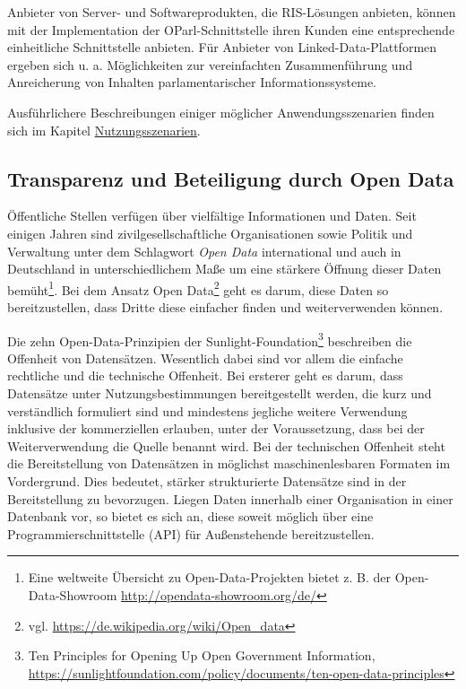 \documentclass[,a4paper]{article}
\begin{document}
Anbieter von Server- und Softwareprodukten, die RIS-Lösungen anbieten,
können mit der Implementation der OParl-Schnittstelle ihren Kunden eine
entsprechende einheitliche Schnittstelle anbieten. Für Anbieter von
Linked-Data-Plattformen ergeben sich u. a. Möglichkeiten zur
vereinfachten Zusammenführung und Anreicherung von Inhalten
parlamentarischer Informationssysteme.

Ausführlichere Beschreibungen einiger möglicher Anwendungsszenarien
finden sich im Kapitel \hyperref[nutzungsszenarien]{Nutzungsszenarien}.

\subsection{Transparenz und Beteiligung durch Open
Data}\label{transparenz-und-beteiligung-durch-open-data}

Öffentliche Stellen verfügen über vielfältige Informationen und Daten.
Seit einigen Jahren sind zivilgesellschaftliche Organisationen sowie
Politik und Verwaltung unter dem Schlagwort \emph{Open Data}
international und auch in Deutschland in unterschiedlichem Maße um eine
stärkere Öffnung dieser Daten bemüht\footnote{Eine weltweite Übersicht
  zu Open-Data-Projekten bietet z. B. der Open-Data-Showroom
  \url{http://opendata-showroom.org/de/}}. Bei dem Ansatz Open
Data\footnote{vgl. \url{https://de.wikipedia.org/wiki/Open_data}} geht
es darum, diese Daten so bereitzustellen, dass Dritte diese einfacher
finden und weiterverwenden können.

Die zehn Open-Data-Prinzipien der Sunlight-Foundation\footnote{Ten
  Principles for Opening Up Open Government Information,
  \url{https://sunlightfoundation.com/policy/documents/ten-open-data-principles}}
beschreiben die Offenheit von Datensätzen. Wesentlich dabei sind vor
allem die einfache rechtliche und die technische Offenheit. Bei ersterer
geht es darum, dass Datensätze unter Nutzungsbestimmungen bereitgestellt
werden, die kurz und verständlich formuliert sind und mindestens
jegliche weitere Verwendung inklusive der kommerziellen erlauben, unter
der Voraussetzung, dass bei der Weiterverwendung die Quelle benannt
wird. Bei der technischen Offenheit steht die Bereitstellung von
Datensätzen in möglichst maschinenlesbaren Formaten im Vordergrund. Dies
bedeutet, stärker strukturierte Datensätze sind in der Bereitstellung zu
bevorzugen. Liegen Daten innerhalb einer Organisation in einer Datenbank
vor, so bietet es sich an, diese soweit möglich über eine
Programmierschnittstelle (API) für Außenstehende bereitzustellen.
\end{document}
